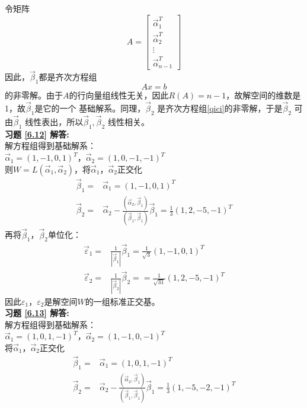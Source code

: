 \documentclass[a4paper]{book}
\begin{document}
令矩阵
\begin{equation*}
A=\begin{bmatrix}\vec{\alpha}_1^T\\ \vec{\alpha}_2^T\\ \vdots\\ \vec{\alpha}_{n-1}^T\end{bmatrix}
\end{equation*}
因此，$\vec{\beta}_1$都是齐次方程组
\begin{equation}\label{qici}
Ax=b
\end{equation}
的非零解。由于$A$的行向量组线性无关，因此$R(A)=n-1$，故解空间的维数是1，故$\vec{\beta}_1$是它的一个
基础解系。同理，$\vec{\beta}_2$ 是齐次方程组\eqref{qici}的非零解，于是$\vec{\beta}_2$ 可由$\vec{\beta}_1$
线性表出，所以$\vec{\beta}_1,\vec{\beta}_2$ 线性相关。 \\
\textbf{习题 \ref{6.12} 解答:}\\
解方程组得到基础解系：\\
$\vec{\alpha}_1=(1,-1,0,1)^T$，$\vec{\alpha}_2=(1,0,-1,-1)^T$\\
则$W=L(\vec{\alpha}_1,\vec{\alpha}_2)$，将$\vec{\alpha}_1$，$\vec{\alpha}_2$正交化
\begin{align*}
\vec{\beta}_1=&\vec{\alpha}_1=(1,-1,0,1)^T\\
\vec{\beta}_2=&\vec{\alpha}_2-\frac{(\vec{\alpha}_2,\vec{\beta}_1)}{(\vec{\beta}_1,\vec{\beta}_1)}\vec{\beta}_1=\frac{1}{3}(1,2,-5,-1)^T
\end{align*}
再将$\vec{\beta}_1$，$\vec{\beta}_2$单位化：
\begin{align*}
\vec{\varepsilon}_1=&\frac{1}{|\vec{\beta}_1|}\vec{\beta}_1=\frac{1}{\sqrt{3}}(1,-1,0,1)^T\\
\vec{\varepsilon}_2=&\frac{1}{|\vec{\beta}_2|}\vec{\beta}_2==\frac{1}{\sqrt{31}}(1,2,-5,-1)^T
\end{align*}
因此$\varepsilon_1$，$\varepsilon_2$是解空间$W$的一组标准正交基。\\
\textbf{习题 \ref{6.13} 解答:}\\
解方程组得到基础解系：\\
$\vec{\alpha}_1=(1,0,1,-1)^T$，$\vec{\alpha}_2=(1,-1,0,-1)^T$\\
将$\vec{\alpha}_1$，$\vec{\alpha}_2$正交化
\begin{align*}
\vec{\beta}_1=&\vec{\alpha}_1=(1,0,1,-1)^T\\
\vec{\beta}_2=&\vec{\alpha}_2-\frac{(\vec{\alpha}_2,\vec{\beta}_1)}{(\vec{\beta}_1,\vec{\beta}_1)}\vec{\beta}_1=\frac{1}{3}(1,-5,-2,-1)^T\\
\end{align*}
\end{document}
